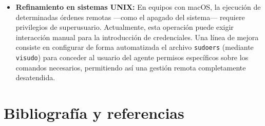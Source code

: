 \documentclass[12pt, a4paper, twoside]{article}
\begin{document}
\begin{itemize}
  \item \textbf{Refinamiento en sistemas UNIX:} En equipos con macOS, la ejecución de determinadas órdenes remotas ---como el apagado del sistema--- requiere privilegios de superusuario. Actualmente, esta operación puede exigir interacción manual para la introducción de credenciales. Una línea de mejora consiste en configurar de forma automatizada el archivo \texttt{sudoers} (mediante \texttt{visudo}) para conceder al usuario del agente permisos específicos sobre los comandos necesarios, permitiendo así una gestión remota completamente desatendida.
\end{itemize}

\section{Bibliografía y referencias}
\end{document}
